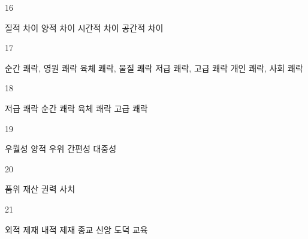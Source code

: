 \documentclass[fs9,seriesRus]{korfarm-base}
\begin{document}
\begin{kfSentenceUnit}{16}{}
\begin{kfChoices}
\kfChoice 질적 차이
\kfChoice 양적 차이
\kfChoice 시간적 차이
\kfChoice 공간적 차이
\end{kfChoices}
\end{kfSentenceUnit}

\begin{kfSentenceUnit}{17}{}
\begin{kfChoices}
\kfChoice 순간 쾌락, 영원 쾌락
\kfChoice 육체 쾌락, 물질 쾌락
\kfChoice 저급 쾌락, 고급 쾌락
\kfChoice 개인 쾌락, 사회 쾌락
\end{kfChoices}
\end{kfSentenceUnit}

\begin{kfSentenceUnit}{18}{}
\begin{kfChoices}
\kfChoice 저급 쾌락
\kfChoice 순간 쾌락
\kfChoice 육체 쾌락
\kfChoice 고급 쾌락
\end{kfChoices}
\end{kfSentenceUnit}

\begin{kfSentenceUnit}{19}{}
\begin{kfChoices}
\kfChoice 우월성
\kfChoice 양적 우위
\kfChoice 간편성
\kfChoice 대중성
\end{kfChoices}
\end{kfSentenceUnit}

\begin{kfSentenceUnit}{20}{}
\begin{kfChoices}
\kfChoice 품위
\kfChoice 재산
\kfChoice 권력
\kfChoice 사치
\end{kfChoices}
\end{kfSentenceUnit}

\begin{kfSentenceUnit}{21}{}
\begin{kfChoices}
\kfChoice 외적 제재
\kfChoice 내적 제재
\kfChoice 종교 신앙
\kfChoice 도덕 교육
\end{kfChoices}
\end{kfSentenceUnit}
\end{document}
